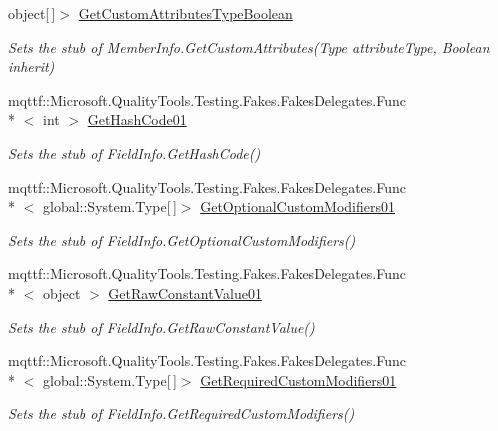 \begin{DoxyCompactItemize}
object\mbox{[}$\,$\mbox{]}$>$ \hyperlink{class_system_1_1_reflection_1_1_fakes_1_1_stub_field_info_a9c442faec8aa9b72af8c1f5da1b9555d}{Get\-Custom\-Attributes\-Type\-Boolean}
\begin{DoxyCompactList}\small\item\em Sets the stub of Member\-Info.\-Get\-Custom\-Attributes(\-Type attribute\-Type, Boolean inherit)\end{DoxyCompactList}\item 
mqttf\-::\-Microsoft.\-Quality\-Tools.\-Testing.\-Fakes.\-Fakes\-Delegates.\-Func\\*
$<$ int $>$ \hyperlink{class_system_1_1_reflection_1_1_fakes_1_1_stub_field_info_ab1498e7c86ff32afb7ed2b1d5d454860}{Get\-Hash\-Code01}
\begin{DoxyCompactList}\small\item\em Sets the stub of Field\-Info.\-Get\-Hash\-Code()\end{DoxyCompactList}\item 
mqttf\-::\-Microsoft.\-Quality\-Tools.\-Testing.\-Fakes.\-Fakes\-Delegates.\-Func\\*
$<$ global\-::\-System.\-Type\mbox{[}$\,$\mbox{]}$>$ \hyperlink{class_system_1_1_reflection_1_1_fakes_1_1_stub_field_info_a29862962dfb8b214cbd9a39a57277619}{Get\-Optional\-Custom\-Modifiers01}
\begin{DoxyCompactList}\small\item\em Sets the stub of Field\-Info.\-Get\-Optional\-Custom\-Modifiers()\end{DoxyCompactList}\item 
mqttf\-::\-Microsoft.\-Quality\-Tools.\-Testing.\-Fakes.\-Fakes\-Delegates.\-Func\\*
$<$ object $>$ \hyperlink{class_system_1_1_reflection_1_1_fakes_1_1_stub_field_info_a6f6d572997b8f3bb5a8dd22324f7c4c7}{Get\-Raw\-Constant\-Value01}
\begin{DoxyCompactList}\small\item\em Sets the stub of Field\-Info.\-Get\-Raw\-Constant\-Value()\end{DoxyCompactList}\item 
mqttf\-::\-Microsoft.\-Quality\-Tools.\-Testing.\-Fakes.\-Fakes\-Delegates.\-Func\\*
$<$ global\-::\-System.\-Type\mbox{[}$\,$\mbox{]}$>$ \hyperlink{class_system_1_1_reflection_1_1_fakes_1_1_stub_field_info_a892f5fc48f583e3482a9a33f53576bcd}{Get\-Required\-Custom\-Modifiers01}
\begin{DoxyCompactList}\small\item\em Sets the stub of Field\-Info.\-Get\-Required\-Custom\-Modifiers()\end{DoxyCompactList}\item 

\end{DoxyCompactItemize}
